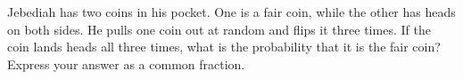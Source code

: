 Jebediah has two coins in his pocket. One is a fair coin, while the other has heads on both sides. He pulls one coin out at random and flips it three times. If the coin lands heads all three times, what is the probability that it is the fair coin? Express your answer as a common fraction.
